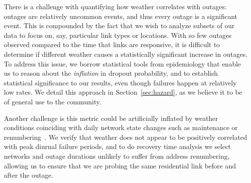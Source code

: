 There is a challenge with quantifying how weather correlates with
outages: outages are relatively uncommon events, and thus every outage
is a significant event.
%
%
This is compounded by the fact that we wish to analyze subsets of our
data to focus on, say, particular link types or locations.
%
With so few outages observed compared to the time that links are responsive,
it is difficult to determine if different weather causes a statistically significant
increase in outages.
%
To address this issue, we borrow statistical tools from epidemiology
that enable us to reason about the \emph{inflation} in dropout
probability, and to establish statistical significance to our results,
even though failures happen at relatively low rates.
%
We detail this approach in Section~\ref{sec:hazard}, as we believe it
to be of general use to the community.



Another challenge is this metric could be artificially inflated by
weather conditions coinciding with daily network state changes such as
maintenance or renumbering~\cite{addrchange-imc}.
%
We verify that weather does not appear to be positively correlated with
peak diurnal failure periods, and to do recovery time analysis we
select networks and outage durations unlikely to suffer from address
renumbering, allowing us to ensure that we are probing the same
residential link before and after the outage.

